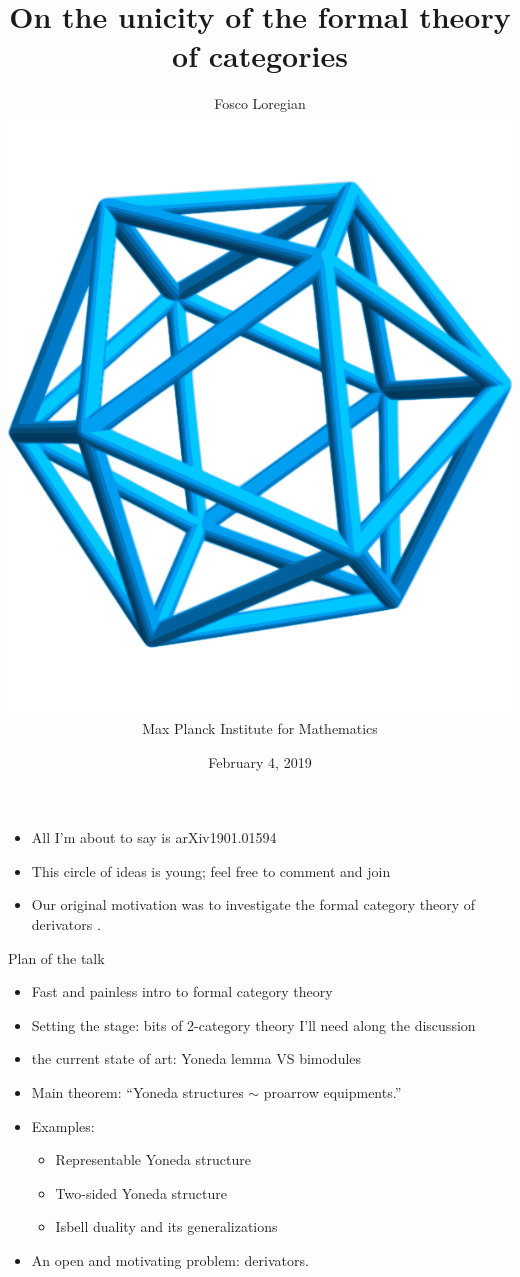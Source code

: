 \documentclass{beamer}
\author[Fosco Loregian]{%
	Fosco Loregian \\ 
	\includegraphics[scale=.05]{MPIM.png} \\ 
	Max Planck Institute for Mathematics%
}
\title[Unicity]{On the unicity of the formal theory of categories}
\date{February 4, 2019}
\begin{document}
\begin{frame}
	\maketitle
\end{frame}

\begin{frame}
	\begin{itemize}
		\item<1-> All I'm about to say is \alert{arXiv1901.01594}
		\item<2-> This circle of ideas is young; feel free to comment and join
		\item<3-> Our original motivation was to investigate the \alert{formal category theory of derivators }.
	\end{itemize}
\end{frame}

\begin{frame}{Plan of the talk}
	\begin{itemize}
		\item<1-> Fast and painless intro to formal category theory
		\item<2-> Setting the stage: bits of 2-category theory I'll need along the discussion
		\item<3-> the current state of art: Yoneda lemma VS bimodules
		\item<4-> \alert{Main theorem}: ``Yoneda structures $\sim$ proarrow equipments.''
		\item<5-> Examples:
		      \begin{itemize}
			      \item Representable Yoneda structure
			      \item Two-sided Yoneda structure
			      \item Isbell duality and its generalizations
		      \end{itemize}
		\item<6-> An open and motivating problem: derivators.
	\end{itemize}
\end{frame}
\end{document}
